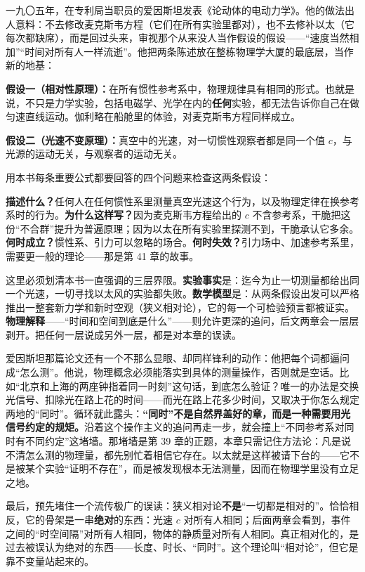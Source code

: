 
一九〇五年，在专利局当职员的爱因斯坦发表《论动体的电动力学》。他的做法出人意料：不去修改麦克斯韦方程（它们在所有实验里都对），也不去修补以太（它每次都缺席），而是回过头来，审视那个从来没人当作假设的假设——“速度当然相加”“时间对所有人一样流逝”。他把两条陈述放在整栋物理学大厦的最底层，当作新的地基：

\textbf{假设一（相对性原理）：}在所有惯性参考系中，物理规律具有相同的形式。也就是说，不只是力学实验，包括电磁学、光学在内的\textbf{任何}实验，都无法告诉你自己在做匀速直线运动。伽利略在船舱里的体验，对麦克斯韦方程同样成立。

\textbf{假设二（光速不变原理）：}真空中的光速，对一切惯性观察者都是同一个值 \(c\)，与光源的运动无关，与观察者的运动无关。

用本书每条重要公式都要回答的四个问题来检查这两条假设：

\textbf{描述什么？}任何人在任何惯性系里测量真空光速这个行为，以及物理定律在换参考系时的行为。\textbf{为什么这样写？}因为麦克斯韦方程给出的 \(c\) 不含参考系，干脆把这份“不合群”提升为普遍原理；因为以太在所有实验里探测不到，干脆承认它多余。\textbf{何时成立？}惯性系、引力可以忽略的场合。\textbf{何时失效？}引力场中、加速参考系里，需要更一般的理论——那是第 41 章的故事。

这里必须划清本书一直强调的三层界限。\textbf{实验事实}是：迄今为止一切测量都给出同一个光速，一切寻找以太风的实验都失败。\textbf{数学模型}是：从两条假设出发可以严格推出一整套新力学和新时空观（狭义相对论），它的每一个可检验预言都被证实。\textbf{物理解释}——“时间和空间到底是什么”——则允许更深的追问，后文两章会一层层剥开。把任何一层说成另外一层，都是对本章的误读。

爱因斯坦那篇论文还有一个不那么显眼、却同样锋利的动作：他把每个词都逼问成“怎么测”。他说，物理概念必须能落实到具体的测量操作，否则就是空话。比如“北京和上海的两座钟指着同一时刻”这句话，到底怎么验证？唯一的办法是交换光信号、扣除光在路上花的时间——而光在路上花多少时间，又取决于你怎么规定两地的“同时”。循环就此露头：\textbf{“同时”不是自然界盖好的章，而是一种需要用光信号约定的规矩。}沿着这个操作主义的追问再走一步，就会撞上“不同参考系对同时有不同约定”这堵墙。那堵墙是第 39 章的正题，本章只需记住方法论：凡是说不清怎么测的物理量，都先别忙着相信它存在。以太就是这样被请下台的——它不是被某个实验“证明不存在”，而是被发现根本无法测量，因而在物理学里没有立足之地。

最后，预先堵住一个流传极广的误读：狭义相对论\textbf{不是}“一切都是相对的”。恰恰相反，它的骨架是一串\textbf{绝对}的东西：光速 \(c\) 对所有人相同；后面两章会看到，事件之间的“时空间隔”对所有人相同，物体的静质量对所有人相同。真正相对化的，是过去被误认为绝对的东西——长度、时长、“同时”。这个理论叫“相对论”，但它是靠不变量站起来的。


